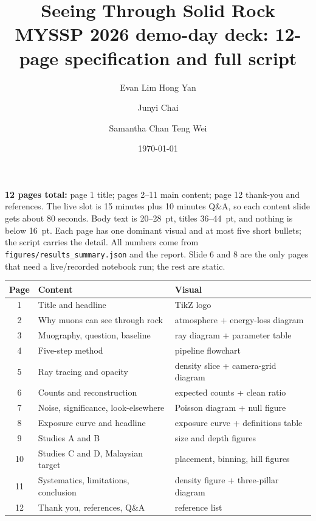 \documentclass[11pt,a4paper]{article}
\title{\textbf{Seeing Through Solid Rock}\\[2pt]
       \large MYSSP 2026 demo-day deck: 12-page specification and full script}
\author{Evan Lim Hong Yan \and Junyi Chai \and Samantha Chan Teng Wei}
\date{\today}
\begin{document}
\maketitle
\vspace{-1.2em}

\begin{tcolorbox}[colback=gray!5,colframe=gray!50!black,
  title={\textbf{Deck map and production rules}}]
\textbf{12 pages total:} page 1 title; pages 2--11 main content; page 12
thank-you and references. The live slot is 15 minutes plus 10 minutes Q\&A,
so each content slide gets about 80 seconds. Body text is 20--28~pt, titles
36--44~pt, and nothing is below 16~pt. Each page has one dominant visual and at
most five short bullets; the script carries the detail. All numbers come from
\texttt{figures/results\_summary.json} and the report. Slide 6 and 8 are the
only pages that need a live/recorded notebook run; the rest are static.

\smallskip
\begin{tabular}{@{}cll@{}}
\toprule
Page & Content & Visual \\
\midrule
1 & Title and headline & TikZ logo \\
2 & Why muons can see through rock & atmosphere + energy-loss diagram \\
3 & Muography, question, baseline & ray diagram + parameter table \\
4 & Five-step method & pipeline flowchart \\
5 & Ray tracing and opacity & density slice + camera-grid diagram \\
6 & Counts and reconstruction & expected counts + clean ratio \\
7 & Noise, significance, look-elsewhere & Poisson diagram + null figure \\
8 & Exposure curve and headline & exposure curve + definitions table \\
9 & Studies A and B & size and depth figures \\
10 & Studies C and D, Malaysian target & placement, binning, hill figures \\
11 & Systematics, limitations, conclusion & density figure + three-pillar diagram \\
12 & Thank you, references, Q\&A & reference list \\
\bottomrule
\end{tabular}
\end{tcolorbox}
\end{document}
